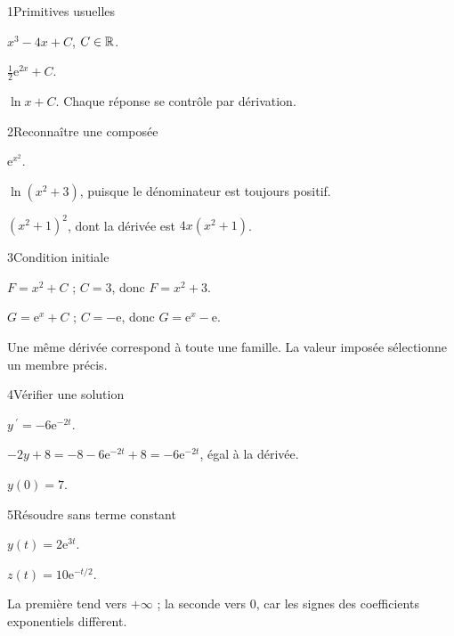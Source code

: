 \begin{corrige}{1}{Primitives usuelles}
\begin{questions}
\item $x^3-4x+C$, $C\in\mathbb{R}$.
\item $\tfrac12\mathrm e^{2x}+C$.
\item $\ln x+C$. Chaque réponse se contrôle par dérivation.
\end{questions}
\end{corrige}
\begin{corrige}{2}{Reconnaître une composée}
\begin{questions}
\item $\mathrm e^{x^2}$.
\item $\ln(x^2+3)$, puisque le dénominateur est toujours positif.
\item $(x^2+1)^2$, dont la dérivée est $4x(x^2+1)$.
\end{questions}
\end{corrige}
\begin{corrige}{3}{Condition initiale}
\begin{questions}
\item $F=x^2+C$ ; $C=3$, donc $F=x^2+3$.
\item $G=\mathrm e^x+C$ ; $C=-\mathrm e$, donc $G=\mathrm e^x-\mathrm e$.
\item Une même dérivée correspond à toute une famille. La valeur imposée sélectionne un membre précis.
\end{questions}
\end{corrige}
\begin{corrige}{4}{Vérifier une solution}
\begin{questions}
\item $y\,\!^{\prime}=-6\mathrm e^{-2t}$.
\item $-2y+8=-8-6\mathrm e^{-2t}+8=-6\mathrm e^{-2t}$, égal à la dérivée.
\item $y(0)=7$.
\end{questions}
\end{corrige}
\begin{corrige}{5}{Résoudre sans terme constant}
\begin{questions}
\item $y(t)=2\mathrm e^{3t}$.
\item $z(t)=10\mathrm e^{-t/2}$.
\item La première tend vers $+\infty$ ; la seconde vers $0$, car les signes des coefficients exponentiels diffèrent.
\end{questions}
\end{corrige}
